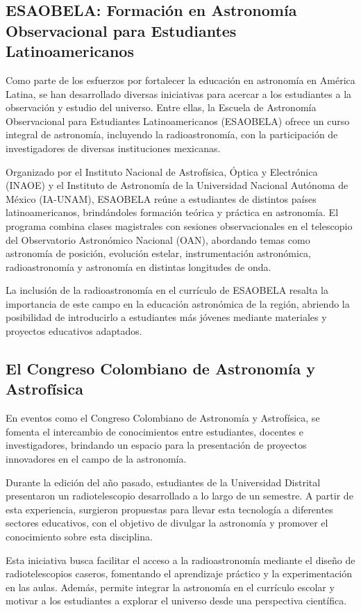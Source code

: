 \subsection{ESAOBELA: Formación en Astronomía Observacional para Estudiantes Latinoamericanos}

Como parte de los esfuerzos por fortalecer la educación en astronomía en América
Latina, se han desarrollado diversas iniciativas para acercar a los estudiantes
a la observación y estudio del universo.
Entre ellas, la Escuela de Astronomía Observacional para Estudiantes
Latinoamericanos (ESAOBELA) ofrece un curso integral de astronomía, incluyendo
la radioastronomía, con la participación de investigadores de diversas
instituciones mexicanas. \parencite{GobiernoMexico2024}

Organizado por el Instituto Nacional de Astrofísica, Óptica y Electrónica (INAOE)
y el Instituto de Astronomía de la Universidad Nacional Autónoma de México (IA-UNAM),
ESAOBELA reúne a estudiantes de distintos países latinoamericanos, brindándoles
formación teórica y práctica en astronomía.
El programa combina clases magistrales con sesiones observacionales en el
telescopio del Observatorio Astronómico Nacional (OAN), abordando temas como
astronomía de posición, evolución estelar, instrumentación astronómica,
radioastronomía y astronomía en distintas longitudes de onda.

La inclusión de la radioastronomía en el currículo de ESAOBELA resalta la
importancia de este campo en la educación astronómica de la región, abriendo la
posibilidad de introducirlo a estudiantes más jóvenes mediante materiales y
proyectos educativos adaptados.

\subsection{ El Congreso Colombiano de Astronom\'ia y Astrof\'isica}

En eventos como el Congreso Colombiano de Astronom\'ia y Astrof\'isica, se
fomenta el intercambio de conocimientos entre estudiantes, docentes e
investigadores, brindando un espacio para la presentaci\'on de proyectos
innovadores en el campo de la astronom\'ia.

Durante la edici\'on del a\~no pasado, estudiantes de la Universidad Distrital
presentaron un radiotelescopio desarrollado a lo largo de un semestre.
A partir de esta experiencia, surgieron propuestas para llevar esta tecnolog\'ia
a diferentes sectores educativos, con el objetivo de divulgar la astronom\'ia y
promover el conocimiento sobre esta disciplina. \parencite{Anzola2024}

Esta iniciativa busca facilitar el acceso a la radioastronom\'ia mediante el
dise\~no de radiotelescopios caseros, fomentando el aprendizaje pr\'actico y la
experimentaci\'on en las aulas.
Adem\'as, permite integrar la astronom\'ia en el curr\'iculo escolar y motivar a
los estudiantes a explorar el universo desde una perspectiva cient\'ifica.
